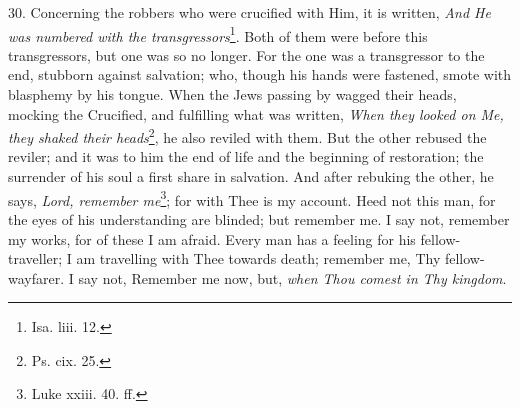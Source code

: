 30. Concerning the robbers who were crucified with Him, it is written, \emph{And He was numbered with the transgressors}\footnote{Isa. liii. 12.}. Both of them were before this transgressors, but one was so no longer. For the one was a transgressor to the end, stubborn against salvation; who, though his hands were fastened, smote with blasphemy by his tongue. When the Jews passing by wagged their heads, mocking the Crucified, and fulfilling what was written, \emph{When they looked on Me, they shaked their heads}\footnote{Ps. cix. 25.}, he also reviled with them. But the other rebused the reviler; and it was to him the end of life and the beginning of restoration; the surrender of his soul a first share in salvation. And after rebuking the other, he says, \emph{Lord, remember me}\footnote{Luke xxiii. 40. ff.}; for with Thee is my account. Heed not this man, for the eyes of his understanding are blinded; but remember me. I say not, remember my works, for of these I am afraid. Every man has a feeling for his fellow-traveller; I am travelling with Thee towards death; remember me, Thy fellow-wayfarer. I say not, Remember me now, but, \emph{when Thou comest in Thy kingdom}.

